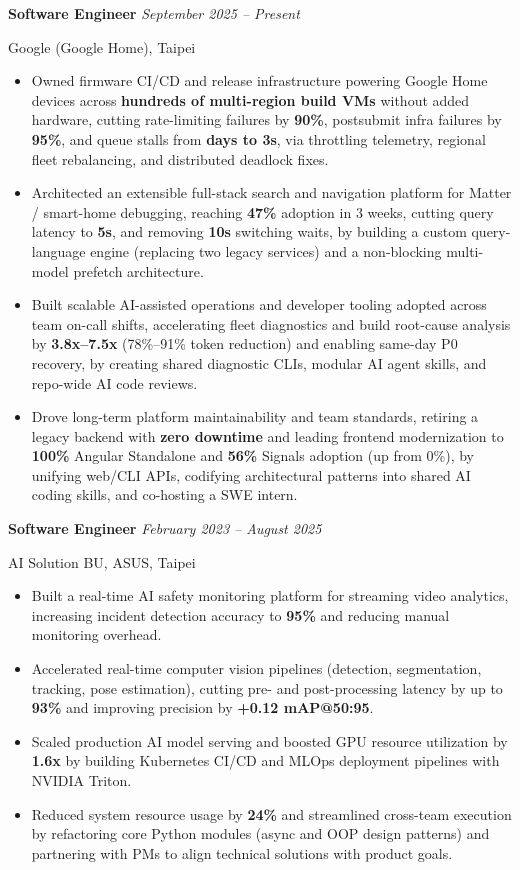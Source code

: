 \documentclass[10pt,a4paper]{article}
\newcommand{\bgt}{\raisebox{0.08ex}{\scalebox{0.82}{\boldmath $>$}}}
\newcommand{\blt}{\raisebox{0.08ex}{\scalebox{0.82}{\boldmath $<$}}}
\newcommand{\bsim}{\raisebox{0.08ex}{\scalebox{0.85}{\boldmath $\sim$}}}
\newenvironment{workexperience}[4]{%
  \noindent\textbf{\normalsize #1} \hfill {\small\textcolor{customblue}{\textit{#4}}}\par
  \vspace{0.02cm}
  {\small\textcolor{mutedgray}{#2, #3}}\par
  \vspace{-0.13cm}
  \begin{itemize}[leftmargin=0.45cm, labelsep=0.22cm, itemsep=0.05cm, topsep=0.07cm, parsep=0pt]
  \fontsize{9.15pt}{11.55pt}\selectfont
}{%
  \end{itemize}
  \vspace{0.04cm}
}
\begin{document}
\begin{workexperience}{Software Engineer}{Google (Google Home)}{Taipei}{September 2025 -- Present}
  \item Owned firmware CI/CD and release infrastructure powering Google Home devices across \textbf{hundreds of multi-region build VMs} without added hardware, cutting rate-limiting failures by \textbf{\bgt90\%}, postsubmit infra failures by \textbf{\bgt95\%}, and queue stalls from \textbf{days to \blt3s}, via throttling telemetry, regional fleet rebalancing, and distributed deadlock fixes.
  \item Architected an extensible full-stack search and navigation platform for Matter / smart-home debugging, reaching \textbf{\bsim47\%} adoption in 3 weeks, cutting query latency to \textbf{\blt5s}, and removing \textbf{\bgt10s} switching waits, by building a custom query-language engine (replacing two legacy services) and a non-blocking multi-model prefetch architecture.
  \item Built scalable AI-assisted operations and developer tooling adopted across team on-call shifts, accelerating fleet diagnostics and build root-cause analysis by \textbf{3.8x--7.5x} (78\%--91\% token reduction) and enabling same-day P0 recovery, by creating shared diagnostic CLIs, modular AI agent skills, and repo-wide AI code reviews.
  \item Drove long-term platform maintainability and team standards, retiring a legacy backend with \textbf{zero downtime} and leading frontend modernization to \textbf{100\%} Angular Standalone and \textbf{56\%} Signals adoption (up from 0\%), by unifying web/CLI APIs, codifying architectural patterns into shared AI coding skills, and co-hosting a SWE intern.
\end{workexperience}

\begin{workexperience}{Software Engineer}{AI Solution BU, ASUS}{Taipei}{February 2023 -- August 2025}
  \item Built a real-time AI safety monitoring platform for streaming video analytics, increasing incident detection accuracy to \textbf{95\%} and reducing manual monitoring overhead.
  \item Accelerated real-time computer vision pipelines (detection, segmentation, tracking, pose estimation), cutting pre- and post-processing latency by up to \textbf{93\%} and improving precision by \textbf{+0.12 mAP@50:95}.
  \item Scaled production AI model serving and boosted GPU resource utilization by \textbf{1.6x} by building Kubernetes CI/CD and MLOps deployment pipelines with NVIDIA Triton.
  \item Reduced system resource usage by \textbf{24\%} and streamlined cross-team execution by refactoring core Python modules (async and OOP design patterns) and partnering with PMs to align technical solutions with product goals.
\end{workexperience}
\end{document}
